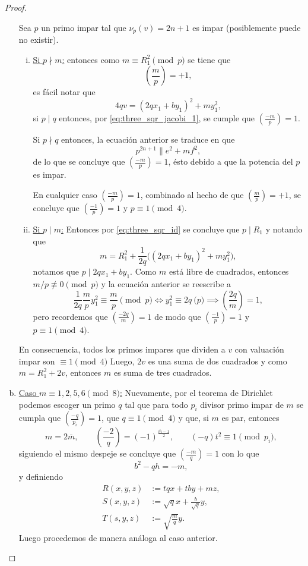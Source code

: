 \documentclass[teoria-numeros.tex]{subfiles}
\begin{document}
\begin{proof}
\begin{enumerate}[(a)]
			Sea $p$ un primo impar tal que $\nu_p(v) = 2n+1$ es impar (posiblemente puede no existir).
			\begin{enumerate}[i)]
				\item \underline{Si $p \nmid m$:}
					entonces como $m \equiv R_1^2 \pmod p$ se tiene que
					$$ \left( \frac{m}{p} \right) = +1, $$
					es fácil notar que
					$$ 4qv = (2qx_1 + by_1)^2 + my_1^2, $$
					si $p \mid q$ entonces, por \eqref{eq:three_sqr_jacobi_1}, se cumple que $ \left( \frac{-m}{p} \right) = 1 $.

					Si $p \nmid q$ entonces, la ecuación anterior se traduce en que
					$$ p^{2n+1} \parallel e^2 + mf^2, $$
					de lo que se concluye que $ \left( \frac{-m}{p} \right) = 1 $, ésto debido a que la potencia del $p$ es impar.

					En cualquier caso $\left( \frac{-m}{p} \right) = 1$, combinado al hecho de que $\left( \frac{m}{p} \right) = +1$, se
					concluye que $\left( \frac{-1}{p} \right) = 1$ y $p \equiv 1 \pmod 4$.

				\item \underline{Si $p \mid m$:}
					Entonces por \eqref{eq:three_sqr_id} se concluye que $p \mid R_1$ y notando que
					$$ m = R_1^2 + \frac{1}{2q}\big( (2qx_1 + by_1)^2 + my_1^2 \big), $$
					notamos que $p \mid 2qx_1 + by_1$.
					Como $m$ está libre de cuadrados, entonces $m/p \not\equiv 0 \pmod p$ y la ecuación anterior se
					reescribe a
					$$ \frac{1}{2q} \frac{m}{p} y_1^2 \equiv \frac{m}{p} \pmod p \iff y_1^2 \equiv 2q \pod p
					\implies \left( \frac{2q}{m} \right) = 1, $$
					pero recordemos que $\left( \frac{-2q}{m} \right) = 1$ de modo que $\left( \frac{-1}{p} \right) = 1$ y $p \equiv 1 \pmod 4$.
			\end{enumerate}
			En consecuencia, todos los primos impares que dividen a $v$ con valuación impar son $\equiv 1 \pmod 4$
			Luego, $2v$ es una suma de dos cuadrados y como $m = R_1^2 + 2v$, entonces $m$ es suma de tres cuadrados.

		\item \underline{Caso $m \equiv 1, 2, 5, 6 \pmod 8$:} 
			Nuevamente, por el teorema de Dirichlet podemos escoger un primo $q$ tal que para todo $p_i$ divisor primo impar de $m$
			se cumpla que $ \left( \frac{-q}{p_i} \right) = 1 $, que $q \equiv 1 \pmod 4$ y que, si $m$ es par, entonces
			$$ m = 2\bar m, \qquad \left(\frac{-2}{q}\right) = (-1)^{ \frac{\bar m - 1}{2} }, \qquad (-q)t^2 \equiv 1 \pmod{p_i}, $$
			siguiendo el mismo despeje se concluye que $ \left(\frac{-m}{q}\right) = 1$ con lo que
			$$ b^2 - qh = -m, $$
			y definiendo
			\begin{align*}
				R(x, y, z) &:= tqx + tby + mz, \\
				S(x, y, z) &:= \sqrt{q}x + \frac{b}{\sqrt{q}}y, \\
				T(s, y, z) &:= \sqrt{ \frac{m}{q} } y.
			\end{align*}
			Luego procedemos de manera análoga al caso anterior. \qedhere
	\end{enumerate}
\end{proof}
\end{document}
